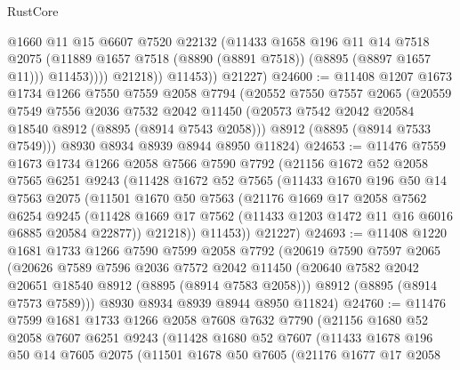 \begin{lexlean}{RustCore}
\begin{coremodule}
                    @1660
                    @11
                    @15
                    @6607
                    @7520
                    @22132
                    (@11433
                      @1658
                      @196
                      @11
                      @14
                      @7518
                      @2075
                      (@11889 @1657 @7518 (@8890 (@8891 @7518)) (@8895 (@8897 @1657 @11)))
                      @11453))))
              @21218))
          @11453))
      @21227)
@24600 := @11408
    @1207
    @1673
    @1734
    @1266
    @7550
    @7559
    @2058
    @7794
    (@20552
      @7550
      @7557
      @2065
      (@20559
        @7549
        @7556
        @2036
        @7532
        @2042
        @11450
        (@20573 @7542 @2042 @20584 @18540 @8912 (@8895 (@8914 @7543 @2058)))
        @8912
        (@8895 (@8914 @7533 @7549)))
      @8930
      @8934
      @8939
      @8944
      @8950
      @11824)
@24653 := @11476
    @7559
    @1673
    @1734
    @1266
    @2058
    @7566
    @7590
    @7792
    (@21156
      @1672
      @52
      @2058
      @7565
      @6251
      @9243
      (@11428
        @1672
        @52
        @7565
        (@11433
          @1670
          @196
          @50
          @14
          @7563
          @2075
          (@11501
            @1670
            @50
            @7563
            (@21176
              @1669
              @17
              @2058
              @7562
              @6254
              @9245
              (@11428 @1669 @17 @7562 (@11433 @1203 @1472 @11 @16 @6016 @6885 @20584 @22877))
              @21218))
          @11453))
      @21227)
@24693 := @11408
    @1220
    @1681
    @1733
    @1266
    @7590
    @7599
    @2058
    @7792
    (@20619
      @7590
      @7597
      @2065
      (@20626
        @7589
        @7596
        @2036
        @7572
        @2042
        @11450
        (@20640 @7582 @2042 @20651 @18540 @8912 (@8895 (@8914 @7583 @2058)))
        @8912
        (@8895 (@8914 @7573 @7589)))
      @8930
      @8934
      @8939
      @8944
      @8950
      @11824)
@24760 := @11476
    @7599
    @1681
    @1733
    @1266
    @2058
    @7608
    @7632
    @7790
    (@21156
      @1680
      @52
      @2058
      @7607
      @6251
      @9243
      (@11428
        @1680
        @52
        @7607
        (@11433
          @1678
          @196
          @50
          @14
          @7605
          @2075
          (@11501
            @1678
            @50
            @7605
            (@21176
              @1677
              @17
              @2058

\end{coremodule}
\end{lexlean}
